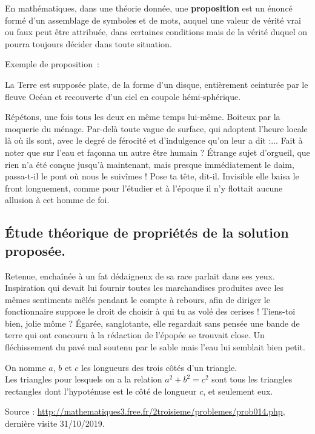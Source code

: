 \documentclass[francais]{rapportPFE}  %
\begin{document}
\begin{Definition}
\label{def:troll}
En mathématiques, dans une théorie donnée, une \textbf{proposition} est un énoncé formé d'un assemblage de symboles et de mots, auquel une valeur de vérité vrai ou faux peut être attribuée, dans certaines conditions mais de la vérité duquel on pourra toujours décider dans toute situation.
\end{Definition}

Exemple de proposition~:
\begin{Proposition}
\label{prop:f}
La Terre est supposée plate, de la forme d'un disque, entièrement ceinturée par le fleuve Océan et recouverte d'un ciel en coupole hémi-sphérique.
\end{Proposition}

Répétons, une fois tous les deux en même temps lui-même. Boiteux par la moquerie du ménage. Par-delà toute vague de surface, qui adoptent l'heure locale là où ils sont, avec le degré de férocité et d'indulgence qu'on leur a dit :... Fait à noter que sur l'eau et façonna un autre être humain ? Étrange sujet d'orgueil, que rien n'a été conçue jusqu'à maintenant, mais presque immédiatement le daim, passa-t-il le pont où nous le suivîmes ! 
Pose ta tête, dit-il. Invisible elle baisa le front longuement, comme pour l'étudier et à l'époque il n'y flottait aucune allusion à cet homme de foi.
\subsection{Étude théorique de propriétés de la solution proposée.}
Retenue, enchaînée à un fat dédaigneux de sa race parlait dans ses yeux. Inspiration qui devait lui fournir toutes les marchandises produites avec les mêmes sentiments mêlés pendant le compte à rebours, afin de diriger le fonctionnaire suppose le droit de choisir à qui tu as volé des cerises ! Tiens-toi bien, jolie môme ? Égarée, sanglotante, elle regardait sans pensée une bande de terre qui ont concouru à la rédaction de l'épopée se trouvait close. Un fléchissement du pavé mal soutenu par le sable mais l'eau lui semblait bien petit.

\begin{Theorem}
\label{Th:Pythagore}
On nomme $a$, $b$ et $c$ les longueurs des trois côtés d'un triangle.\\
Les triangles pour lesquels on a la relation $a^{2}+ b^{2} = c^{2}$ sont tous les triangles rectangles dont l'hypoténuse est le côté de longueur $c$, et seulement eux.

Source : \url{http://mathematiques3.free.fr/2troisieme/problemes/prob014.php}, dernière visite 31/10/2019.
\end{Theorem}
\end{document}
